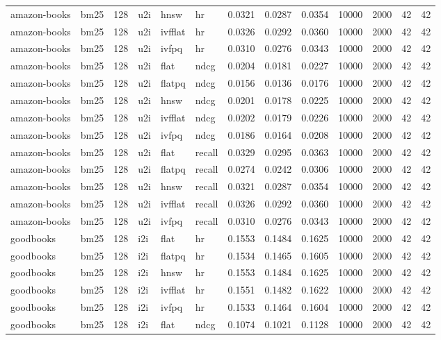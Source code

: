 \begin{tabular}{llrlllrrrrrrr}
amazon-books & bm25 & 128 & u2i & hnsw & hr & 0.0321 & 0.0287 & 0.0354 & 10000 & 2000 & 42 & 42 \\
amazon-books & bm25 & 128 & u2i & ivfflat & hr & 0.0326 & 0.0292 & 0.0360 & 10000 & 2000 & 42 & 42 \\
amazon-books & bm25 & 128 & u2i & ivfpq & hr & 0.0310 & 0.0276 & 0.0343 & 10000 & 2000 & 42 & 42 \\
amazon-books & bm25 & 128 & u2i & flat & ndcg & 0.0204 & 0.0181 & 0.0227 & 10000 & 2000 & 42 & 42 \\
amazon-books & bm25 & 128 & u2i & flatpq & ndcg & 0.0156 & 0.0136 & 0.0176 & 10000 & 2000 & 42 & 42 \\
amazon-books & bm25 & 128 & u2i & hnsw & ndcg & 0.0201 & 0.0178 & 0.0225 & 10000 & 2000 & 42 & 42 \\
amazon-books & bm25 & 128 & u2i & ivfflat & ndcg & 0.0202 & 0.0179 & 0.0226 & 10000 & 2000 & 42 & 42 \\
amazon-books & bm25 & 128 & u2i & ivfpq & ndcg & 0.0186 & 0.0164 & 0.0208 & 10000 & 2000 & 42 & 42 \\
amazon-books & bm25 & 128 & u2i & flat & recall & 0.0329 & 0.0295 & 0.0363 & 10000 & 2000 & 42 & 42 \\
amazon-books & bm25 & 128 & u2i & flatpq & recall & 0.0274 & 0.0242 & 0.0306 & 10000 & 2000 & 42 & 42 \\
amazon-books & bm25 & 128 & u2i & hnsw & recall & 0.0321 & 0.0287 & 0.0354 & 10000 & 2000 & 42 & 42 \\
amazon-books & bm25 & 128 & u2i & ivfflat & recall & 0.0326 & 0.0292 & 0.0360 & 10000 & 2000 & 42 & 42 \\
amazon-books & bm25 & 128 & u2i & ivfpq & recall & 0.0310 & 0.0276 & 0.0343 & 10000 & 2000 & 42 & 42 \\
goodbooks & bm25 & 128 & i2i & flat & hr & 0.1553 & 0.1484 & 0.1625 & 10000 & 2000 & 42 & 42 \\
goodbooks & bm25 & 128 & i2i & flatpq & hr & 0.1534 & 0.1465 & 0.1605 & 10000 & 2000 & 42 & 42 \\
goodbooks & bm25 & 128 & i2i & hnsw & hr & 0.1553 & 0.1484 & 0.1625 & 10000 & 2000 & 42 & 42 \\
goodbooks & bm25 & 128 & i2i & ivfflat & hr & 0.1551 & 0.1482 & 0.1622 & 10000 & 2000 & 42 & 42 \\
goodbooks & bm25 & 128 & i2i & ivfpq & hr & 0.1533 & 0.1464 & 0.1604 & 10000 & 2000 & 42 & 42 \\
goodbooks & bm25 & 128 & i2i & flat & ndcg & 0.1074 & 0.1021 & 0.1128 & 10000 & 2000 & 42 & 42 \\

\end{tabular}
